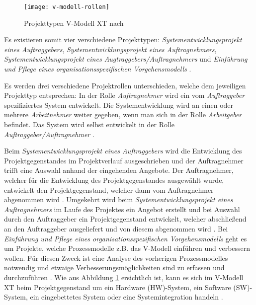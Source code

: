 \begin{figure}[htp]
\begin{center}
  \texttt{[image: v-modell-rollen]} %
  \caption{Projekttypen V-Modell XT nach \cite{2004vmodell}}
  \label{fig:Projekttypen}
\end{center}
\end{figure}

Es existieren somit vier verschiedene Projekttypen: \textit{Systementwicklungsprojekt eines Auftraggebers}, \textit{Systementwicklungsprojekt eines Auftragnehmers},  \textit{Systementwicklungsprojekt eines Augtraggebers/Auftragnehmers}  und \textit{Einführung und Pflege eines organisationsspezifischen Vorgehensmodells} \cite{reinhard2008}. \newline

Es werden drei verschiedene Projektrollen unterschieden, welche dem jeweiligen Projekttyp entsprechen: In der Rolle \textit{Auftragnehmer} wird ein vom \textit{Auftraggeber} spezifiziertes System entwickelt. Die Systementwicklung wird an einen oder mehrere \textit{Arbeitnehmer} weiter gegeben, wenn man sich in der Rolle \textit{Arbeitgeber} befindet. Das System  wird selbst entwickelt in der Rolle \textit{Auftraggeber/Auftragnehmer} \cite{brack2010,2004vmodell}.\newline


Beim \textit{Systementwicklungsprojekt eines Auftraggebers} wird die Entwicklung des Projektgegenstandes im Projektverlauf  ausgeschrieben und der Auftragnehmer trifft eine Auswahl anhand der eingehenden Angebote. Der Auftragnehmer, welcher für die Entwicklung des Projektgegenstandes ausgewählt wurde, entwickelt den Projektgegenstand, welcher dann vom Auftragnehmer abgenommen wird \cite{reinhard2008,2004vmodell}.\newline
Umgekehrt wird beim \textit{Systementwicklungsprojekt eines Auftragnehmers} im Laufe des Projektes ein Angebot erstellt und bei Auswahl durch den Auftraggeber ein Projektgegenstand entwickelt, welcher abschließend an den Auftraggeber ausgeliefert und von diesem abgenommen wird \cite{reinhard2008,2004vmodell}.\newline
Bei \textit{Einführung und Pflege eines organisationsspezifischen Vorgehensmodells} geht es um Projekte, welche Prozessmodelle z.B. das V-Modell einführen und verbessern wollen. Für diesen Zweck ist eine Analyse des vorherigen Prozessmodelles notwendig und etwaige Verbesserungsmöglichkeiten sind zu erfassen und durchzuführen \cite{reinhard2008,2004vmodell}.\newline
Wie aus Abbildung \ref{fig:Projekttypen} ersichtlich ist, kann es sich im V-Modell XT beim Projektgegenstand um ein Hardware (HW)-System, ein Software (SW)-System, ein eingebettetes System oder eine Systemintegration handeln \cite{brack2010,2004vmodell}. \newline

